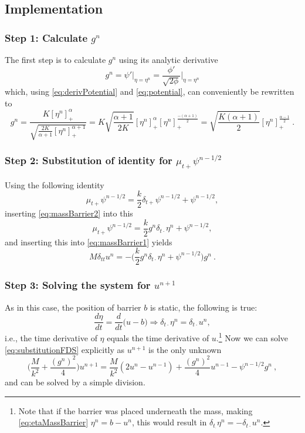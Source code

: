 \documentclass{article}
\begin{document}
\subsection{Implementation}
\subsubsection*{Step 1: Calculate $g^n$}
The first step is to calculate $g^n$ using its analytic derivative
\begin{equation}
    g^n = \psi'\bigg\rvert_{\eta=\eta^n} = \frac{\phi'}{\sqrt{2\phi}}\bigg\rvert_{\eta=\eta^n}
\end{equation}
which, using \eqref{eq:derivPotential} and \eqref{eq:potential}, can conveniently be rewritten to
\begin{equation}\label{eq:gn}
    g^n = \frac{K[\eta^n]_+^\alpha}{\sqrt{\frac{2K}{\alpha+1}[\eta^n]_+^{\alpha+1}}}=K\sqrt{\frac{\alpha+1}{2K}}[\eta^n]_+^\alpha[\eta^n]_+^{\frac{-(\alpha+1)}{2}}=\sqrt{\frac{K(\alpha+1)}{2}}[\eta^n]_+^{\frac{\alpha-1}{2}}\ .
\end{equation}
\subsubsection*{Step 2: Substitution of identity for $\mu_{t+}\psi^{n-1/2}$}
Using the following identity
\begin{equation}
    \mu_{t+}\psi^{n-1/2} = \frac{k}{2}\delta_{t+}\psi^{n-1/2} + \psi^{n-1/2},
\end{equation}
inserting \eqref{eq:massBarrier2} into this 
\begin{equation}\nonumber
    \mu_{t+}\psi^{n-1/2} = \frac{k}{2}g^n\delta_{t\cdot}\eta^n + \psi^{n-1/2},
\end{equation}
and inserting this into \eqref{eq:massBarrier1} yields
\begin{equation}\label{eq:substitutionFDS}
    M\delta_{tt}u^n = -\Big(\frac{k}{2}g^n\delta_{t\cdot}\eta^n + \psi^{n-1/2}\Big)g^n\ .
\end{equation}
\subsubsection*{Step 3: Solving the system for $u^{n+1}$}
As in this case, the position of barrier $b$ is static, the following is true:
\begin{equation}\label{eq:derEtaEqDerU}
    \frac{d\eta}{dt} = \frac{d}{dt}\Big(u - b\Big)\Rightarrow \delta_{t\cdot}\eta^n = \delta_{t\cdot}u^n,
\end{equation}
i.e., the time derivative of $\eta$ equals the time derivative of $u$.\footnote{Note that if the barrier was placed underneath the mass, making \eqref{eq:etaMassBarrier} $\eta^n = b-u^n$, this would result in $\delta_{t_\cdot}\eta^n = -\delta_{t\cdot}u^n$.} Now we can solve \eqref{eq:substitutionFDS} explicitly as $u^{n+1}$ is the only unknown
\begin{equation}
    \bigg(\frac{M}{k^2} + \frac{(g^n)^2}{4}\bigg)u^{n+1} = \frac{M}{k^2}(2u^n-u^{n-1})+\frac{(g^n)^2}{4}u^{n-1}-\psi^{n-1/2}g^n\ ,
\end{equation}
and can be solved by a simple division. 
\end{document}

